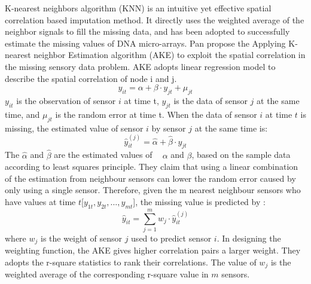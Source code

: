 K-nearest neighbors algorithm (KNN) is an intuitive yet effective spatial correlation based imputation method. It directly uses the weighted average of the neighbor signals to fill the missing data, and has been adopted to successfully estimate the missing values of DNA micro-arrays\cite{Troyanskaya:DNAKNN}.  
Pan\cite{pan2010k} propose the Applying K-nearest neighbor Estimation algorithm (AKE) to exploit the spatial correlation in the missing sensory data problem. 
AKE adopts linear regression model to describe the spatial correlation of node i and j. 
\begin{equation}
y_{it} = \alpha + \beta\cdot y_{jt} + \mu_{jt} 
\end{equation}
$y_{it}$ is the observation of sensor $i$ at time t, $y_{jt}$ is the data of sensor $j$ at the same time, and $\mu_{jt}$ is the random error at time t.   
When the data of sensor $i$ at time $t$ is missing, the estimated value of sensor $i$ by sensor $j$ at the same time is:
\begin{equation}
\hat{y}_{it}^{(j)} =\hat{\alpha} +\hat{\beta}\cdot y_{jt}
\label{ake_j}
\end{equation}
The $\hat{\alpha}$ and $\hat{\beta}$ are the estimated values of  $\alpha$ and $\beta$, based on the sample data according to least squares principle.
They claim that using a linear combination of the estimation from neighbour sensors can lower the random error caused by only using a single sensor. 
Therefore, given the m nearest neighbour sensors who have values at time $t$[$y_{1t}, y_{2t},\dots, y_{mt}$], the missing value is predicted by :   
 \begin{equation}
 \hat{y}_{it} =\sum_{j=1}^m w_j \cdot \hat{y}_{it}^{(j)}
 \label{ake_impute}
 \end{equation}
%
where $w_j$ is the weight of sensor $j$ used to predict sensor $i$. In designing the weighting function, the AKE gives higher correlation pairs a larger weight. They adopts the r-square statistics to rank their correlations. The value of $w_j$ is the weighted average of the corresponding r-square value in $m$ sensors. 
